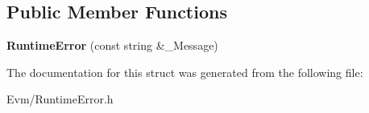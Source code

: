 \subsection*{Public Member Functions}
\begin{DoxyCompactItemize}
\item 
\mbox{\label{struct_evm_1_1_runtime_error_a26abec4fcfe4276cbbcfe9f03eedd54f}} 
{\bfseries Runtime\+Error} (const string \&\+\_\+\+Message)
\end{DoxyCompactItemize}


The documentation for this struct was generated from the following file\+:\begin{DoxyCompactItemize}
\item 
Evm/Runtime\+Error.\+h\end{DoxyCompactItemize}
